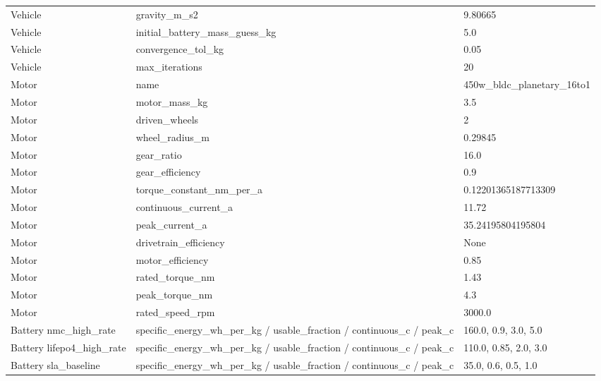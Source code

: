 \begin{longtable}{lll}
Vehicle & gravity\_m\_s2 & 9.80665 \\
Vehicle & initial\_battery\_mass\_guess\_kg & 5.0 \\
Vehicle & convergence\_tol\_kg & 0.05 \\
Vehicle & max\_iterations & 20 \\
Motor & name & 450w\_bldc\_planetary\_16to1 \\
Motor & motor\_mass\_kg & 3.5 \\
Motor & driven\_wheels & 2 \\
Motor & wheel\_radius\_m & 0.29845 \\
Motor & gear\_ratio & 16.0 \\
Motor & gear\_efficiency & 0.9 \\
Motor & torque\_constant\_nm\_per\_a & 0.12201365187713309 \\
Motor & continuous\_current\_a & 11.72 \\
Motor & peak\_current\_a & 35.24195804195804 \\
Motor & drivetrain\_efficiency & None \\
Motor & motor\_efficiency & 0.85 \\
Motor & rated\_torque\_nm & 1.43 \\
Motor & peak\_torque\_nm & 4.3 \\
Motor & rated\_speed\_rpm & 3000.0 \\
Battery nmc\_high\_rate & specific\_energy\_wh\_per\_kg / usable\_fraction / continuous\_c / peak\_c & 160.0, 0.9, 3.0, 5.0 \\
Battery lifepo4\_high\_rate & specific\_energy\_wh\_per\_kg / usable\_fraction / continuous\_c / peak\_c & 110.0, 0.85, 2.0, 3.0 \\
Battery sla\_baseline & specific\_energy\_wh\_per\_kg / usable\_fraction / continuous\_c / peak\_c & 35.0, 0.6, 0.5, 1.0 \\
\bottomrule
\end{longtable}
